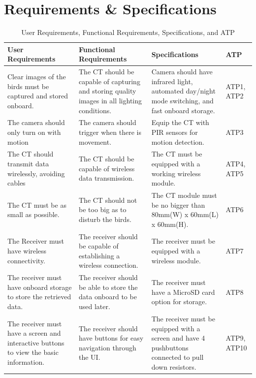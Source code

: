 \section{Requirements \& Specifications}
\begin{table}[h]
\centering
\begin{tabular}{|p{4cm}|p{5cm}|p{5cm}|p{1cm}|}
\hline
\textbf{User Requirements} & \textbf{Functional Requirements} & \textbf{Specifications} & \textbf{ATP} \\
\hline
Clear images of the birds must be captured and stored onboard. & The CT should be capable of capturing and storing quality images in all lighting conditions. & Camera should have infrared light, automated day/night mode switching, and fast onboard storage. & ATP1, ATP2 \\
\hline
The camera should only turn on with motion & The camera should trigger when there is movement. & Equip the CT with PIR sensors for motion detection. & ATP3 \\
\hline
The CT should transmit data wirelessly, avoiding cables & The CT should be capable of wireless data transmission. & The CT must be equipped with a working wireless module. & ATP4, ATP5 \\
\hline
The CT must be as small as possible. & The CT should not be too big as to disturb the birds. & The CT module must be no bigger than 80mm(W) x 60mm(L) x 60mm(H). & ATP6 \\
\hline
The Receiver must have wireless connectivity. & The receiver should be capable of establishing a wireless connection. & The receiver must be equipped with a wireless module. & ATP7 \\
\hline
The receiver must have onboard storage to store the retrieved data. & The receiver should be able to store the data onboard to be used later. & The receiver must have a MicroSD card option for storage. & ATP8 \\
\hline
The receiver must have a screen and interactive buttons to view the basic information. & The receiver should have buttons for easy navigation through the UI. & The receiver must be equipped with a screen and have 4 pushbuttons connected to pull down resistors. & ATP9, ATP10 \\
\hline
\end{tabular}
\caption{User Requirements, Functional Requirements, Specifications, and ATP}
\label{tab:my_label}
\end{table}






